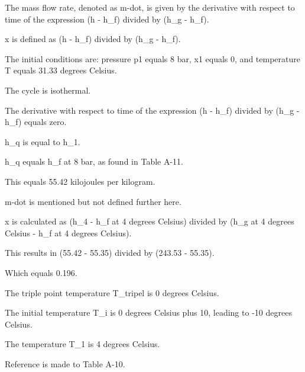 The mass flow rate, denoted as m-dot, is given by the derivative with respect to time of the expression (h - h_f) divided by (h_g - h_f).

x is defined as (h - h_f) divided by (h_g - h_f).

The initial conditions are: pressure p1 equals 8 bar, x1 equals 0, and temperature T equals 31.33 degrees Celsius.

The cycle is isothermal.

The derivative with respect to time of the expression (h - h_f) divided by (h_g - h_f) equals zero.

h_q is equal to h_1.

h_q equals h_f at 8 bar, as found in Table A-11.

This equals 55.42 kilojoules per kilogram.

m-dot is mentioned but not defined further here.

x is calculated as (h_4 - h_f at 4 degrees Celsius) divided by (h_g at 4 degrees Celsius - h_f at 4 degrees Celsius).

This results in (55.42 - 55.35) divided by (243.53 - 55.35).

Which equals 0.196.

The triple point temperature T_tripel is 0 degrees Celsius.

The initial temperature T_i is 0 degrees Celsius plus 10, leading to -10 degrees Celsius.

The temperature T_1 is 4 degrees Celsius.

Reference is made to Table A-10.